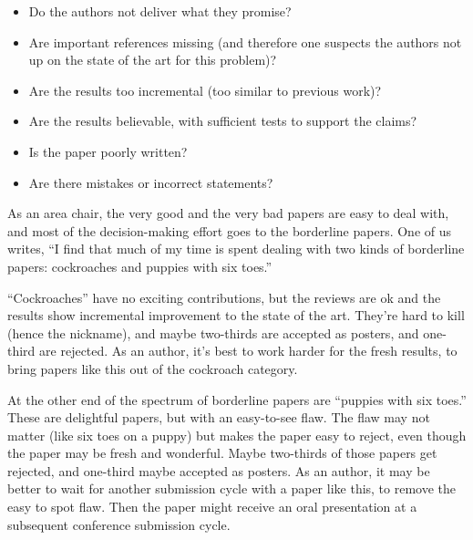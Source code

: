 \begin{itemize}
    \item Do the authors not deliver what they promise?
    \item Are important references missing (and therefore one suspects the authors not up on the state of the art for this problem)?
    \item Are the results too incremental (too similar to previous work)?
    \item Are the results believable, with sufficient tests to support the claims?
    \item Is the paper poorly written?
    \item Are there mistakes or incorrect statements?
\end{itemize}

As an area chair, the very good and the very bad papers are easy to deal with, and most of the decision-making effort goes to the borderline papers.  One of us writes, ``I find that much of my time is spent dealing with two kinds of borderline papers: cockroaches and  puppies with six toes.''

``Cockroaches'' have no exciting contributions, but the reviews are ok and the results show incremental improvement to the state of the art.  They're hard to kill (hence the nickname), and maybe two-thirds are accepted as posters, and one-third are rejected.  As an author, it's best to work harder for the fresh results, to bring papers like this out of the cockroach category.

At the other end of the spectrum of borderline papers are ``puppies with six toes.''  These are delightful papers, but with an easy-to-see flaw.  The flaw may not matter (like six toes on a puppy) but makes the paper easy to reject, even though the paper may be fresh and wonderful.  Maybe two-thirds of those papers get rejected, and one-third maybe accepted as posters.  As an author, it may be better to wait for another submission cycle with a paper like this, to remove the easy to spot flaw.  Then the paper might receive an oral presentation at a subsequent conference submission cycle.


